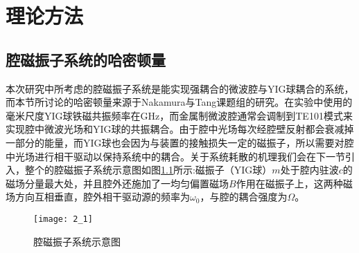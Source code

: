 
\chapter{理论方法}
\label{ch3}

\section{腔磁振子系统的哈密顿量}
本次研究中所考虑的腔磁振子系统是能实现强耦合的微波腔与YIG球耦合的系统，而本节所讨论的哈密顿量来源于Nakamura与Tang课题组的研究\ChangeNotation\cite{PhysRevLett.113.083603Nakamura,PhysRevLett.113.156401Tang,reviewCavityMagnonics}。在实验中使用的毫米尺度YIG球铁磁共振频率在GHz，而金属制微波腔通常会调制到TE101模式来实现腔中微波光场和YIG球的共振耦合。由于腔中光场每次经腔壁反射都会衰减掉一部分的能量，而YIG球也会因为与装置的接触损失一定的磁振子\ChangeNotation，所以需要对腔中光场进行相干驱动以保持系统中的耦合。关于系统耗散的机理我们会在下一节引入，整个的腔磁振子系统示意图如图\ref{FigSetup}所示:磁振子（YIG球）$m$处于腔内驻波$c$的磁场分量最大处，并且腔外还施加了一均匀偏置磁场$B$作用在磁振子上，这两种磁场方向互相垂直，腔外相干驱动源的频率为$\omega_0$，与腔的耦合强度为$\Omega$。
\begin{figure}[htbp]
	\centering
	\texttt{[image: 2\_1]}
	\caption{腔磁振子系统示意图} 
	\label{FigSetup}
\end{figure}

